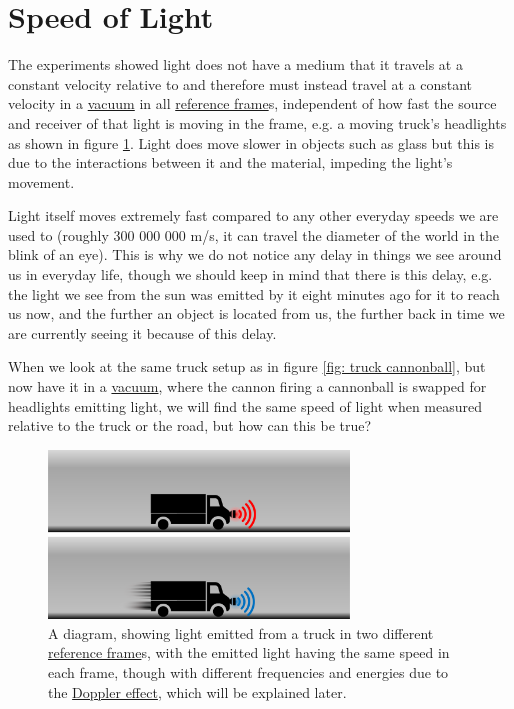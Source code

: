 \section{Speed of Light}%

The experiments showed light does not have a medium that it travels at a constant velocity relative to and therefore must instead travel at a constant velocity in a \hyperlink{def-vacuum}{vacuum} in all \hyperlink{def-Reference-frame}{reference frame}s, independent of how fast the source and receiver of that light is moving in the frame, e.g. a moving truck's headlights as shown in figure \ref{fig: truck torch}. Light does move slower in objects such as glass but this is due to the interactions between it and the material, impeding the light's movement.

Light itself moves extremely fast compared to any other everyday speeds we are used to (roughly 300 000 000 m/s, it can travel the diameter of the world in the blink of an eye). This is why we do not notice any delay in things we see around us in everyday life, though we should keep in mind that there is this delay, e.g. the light we see from the sun was emitted by it eight minutes ago for it to reach us now, and the further an object is located from us, the further back in time we are currently seeing it because of this delay.

When we look at the same truck setup as in figure \ref{fig: truck cannonball}, but now have it in a \hyperlink{def-vacuum}{vacuum}, where the cannon firing a cannonball is swapped for headlights emitting light, we will find the same speed of light when measured relative to the truck or the road, but how can this be true?

\begin{figure}[H]
	\centering
	\includegraphics[width=8cm]{images/pdf/lorry_torch.pdf}
	\caption{A diagram, showing light emitted from a truck in two different \protect\hyperlink{def-Reference-frame}{reference frame}s, with the emitted light having the same speed in each frame, though with different frequencies and energies due to the \protect\hyperlink{def-doppler-effect}{Doppler effect}, which will be explained later.}
	\label{fig: truck torch}
\end{figure}

